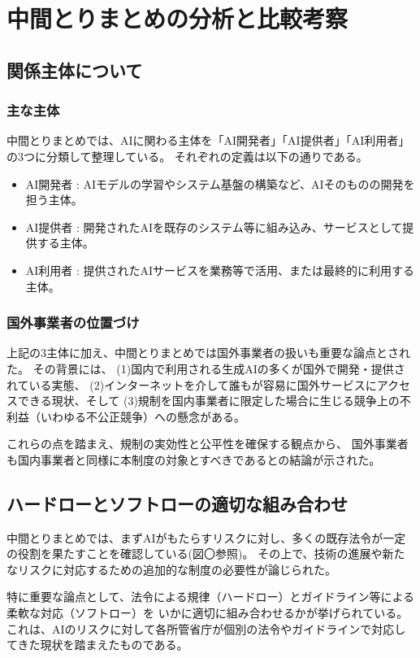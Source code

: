 \chapter{中間とりまとめの分析と比較考察}

\section{関係主体について}

\subsection{主な主体}
中間とりまとめでは、AIに関わる主体を「AI開発者」「AI提供者」「AI利用者」の3つに分類して整理している。
それぞれの定義は以下の通りである。

\begin{itemize}
  \item AI開発者 : AIモデルの学習やシステム基盤の構築など、AIそのものの開発を担う主体。
  \item AI提供者 : 開発されたAIを既存のシステム等に組み込み、サービスとして提供する主体。
  \item AI利用者 : 提供されたAIサービスを業務等で活用、または最終的に利用する主体。
\end{itemize}

\subsection{国外事業者の位置づけ}
上記の3主体に加え、中間とりまとめでは国外事業者の扱いも重要な論点とされた。
その背景には、
(1)国内で利用される生成AIの多くが国外で開発・提供されている実態、
(2)インターネットを介して誰もが容易に国外サービスにアクセスできる現状、そして
(3)規制を国内事業者に限定した場合に生じる競争上の不利益（いわゆる不公正競争）への懸念がある。

これらの点を踏まえ、規制の実効性と公平性を確保する観点から、
国外事業者も国内事業者と同様に本制度の対象とすべきであるとの結論が示された。


\section{ハードローとソフトローの適切な組み合わせ}
中間とりまとめでは、まずAIがもたらすリスクに対し、多くの既存法令が一定の役割を果たすことを確認している(図〇参照)。
その上で、技術の進展や新たなリスクに対応するための追加的な制度の必要性が論じられた。

特に重要な論点として、法令による規律（ハードロー）とガイドライン等による柔軟な対応（ソフトロー）を
いかに適切に組み合わせるかが挙げられている。
これは、AIのリスクに対して各所管省庁が個別の法令やガイドラインで対応してきた現状を踏まえたものである。

